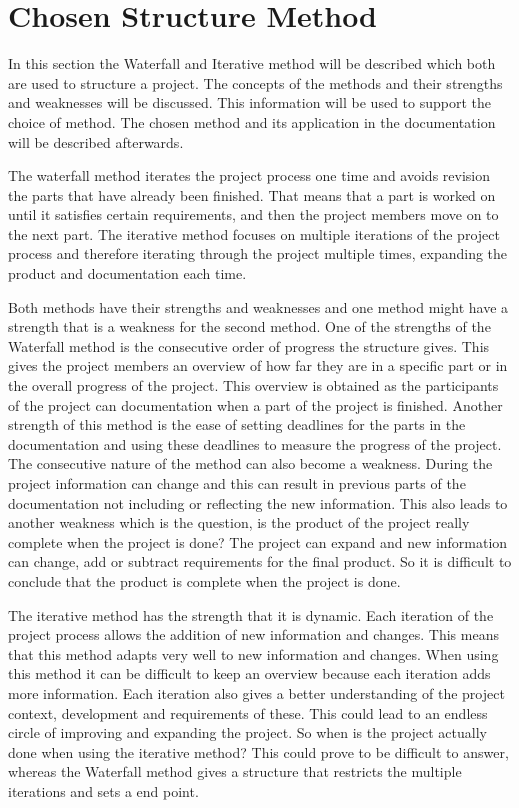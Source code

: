 \section{Chosen Structure Method}

In this section the Waterfall and Iterative method will be described which both are used to structure a project. The concepts of the methods and their strengths and weaknesses will be discussed. This information will be used to support the choice of method. The chosen method and its application in the documentation will be described afterwards.

The waterfall method iterates the project process one time and avoids revision the parts that have already been finished. That means that a part is worked on until it satisfies certain requirements, and then the project members move on to the next part. The iterative method focuses on multiple iterations of the project process and therefore iterating through the project multiple times, expanding the product and documentation each time.

Both methods have their strengths and weaknesses and one method might have a strength that is a weakness for the second method. One of the strengths of the Waterfall method is the consecutive order of progress the structure gives. This gives the project members an overview of how far they are in a specific part or in the overall progress of the project. This overview is obtained as the participants of the project can documentation when a part of the project is finished. Another strength of this method is the ease of setting deadlines for the parts in the documentation and using these deadlines to measure the progress of the project. The consecutive nature of the method can also become a weakness. During the project information can change and this can result in previous parts of the documentation not including or reflecting the new information. This also leads to another weakness which is the question, is the product of the project really complete when the project is done? The project can expand and new information can change, add or subtract requirements for the final product. So it is difficult to conclude that the product is complete when the project is done. 

The iterative method has the strength that it is dynamic. Each iteration of the project process allows the addition of new information and changes. This means that this method adapts very well to new information and changes. When using this method it can be difficult to keep an overview because each iteration adds more information. Each iteration also gives a better understanding of the project context, development and requirements of these. This could lead to an endless circle of improving and expanding the project. So when is the project actually done when using the iterative method? This could prove to be difficult to answer, whereas the Waterfall method gives a structure that restricts the multiple iterations and sets a end point. 

